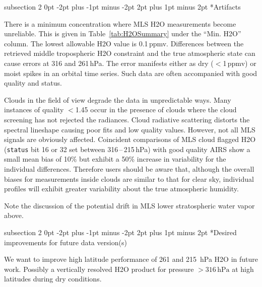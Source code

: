 \documentclass[11pt,draft]{report}
\makeatletter
\renewcommand{\subsection}{\@startsection%
  {subsection}%
  {2}%
  {0pt}%
  {-2pt plus -1pt minus -2pt}%
  {2pt plus 1pt minus 2pt}%
  {\large\sffamily\fontseries{sb}\selectfont\flushleft\color{SectionColor}\figureversion{tabular}}}%
\makeatother
\begin{document}
\subsection*{Artifacts}

There is a minimum concentration where MLS H\cs2O measurements become
unreliable. This is given in Table~\ref{tab:H2OSummary} under the ``Min.
H\cs2O'' column. The lowest allowable H\cs2O value is 0.1\,ppmv.
Differences between the retrieved middle tropospheric H\cs2O constraint
and the true atmospheric state can cause errors at 316 and 261\,hPa.
The error manifests either as dry ($<$1\,ppmv) or moist spikes in an
orbital time series. Such data are often accompanied with good quality
and status.

Clouds in the field of view degrade the data in unpredictable ways. Many
instances of quality $<$1.45 occur in the presence of clouds where the
cloud screening has not rejected the radiances. Cloud radiative
scattering distorts the spectral lineshape causing poor fits and low
quality values.  However, not all MLS signals are obviously
affected. Coincident comparisons of MLS cloud flagged H\cs2O
(\texttt{status} bit 16 or 32 set between 316\,--\,215\,hPa) with good
quality AIRS show a small mean bias of 10\% but exhibit a 50\% increase
in variability for the individual differences. Therefore users should be
aware that, although the overall biases for measurements inside clouds
are similar to that for clear sky, individual profiles will exhibit
greater variability about the true atmospheric humidity.

Note the discussion of the potential drift in MLS lower stratospheric
water vapor above.

\subsection*{Desired improvements for future data version(s)}

We want to improve high latitude performance of 261 and 215~hPa H\cs2O
in future work. Possibly a vertically resolved H\cs2O product for
pressure $>316\,\text{hPa}$ at high latitudes during dry conditions.
\end{document}
